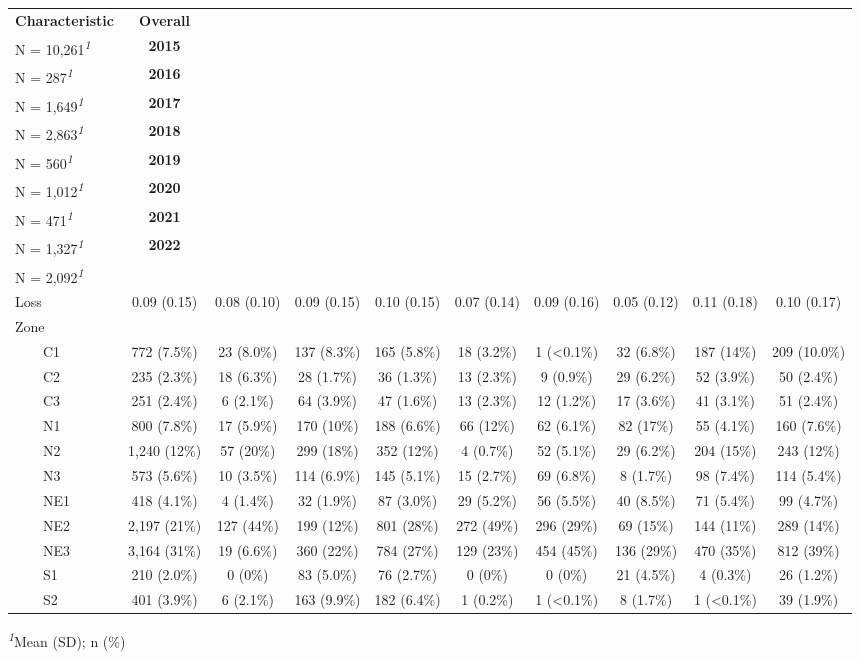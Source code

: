 \begingroup
\fontsize{12.0pt}{14.4pt}\selectfont
\setlength{\LTpost}{0mm}
\begin{longtable}{lccccccccc}
\toprule
\textbf{Characteristic} & \textbf{Overall}\\
N = 10,261\textsuperscript{\textit{1}} & \textbf{2015}\\
N = 287\textsuperscript{\textit{1}} & \textbf{2016}\\
N = 1,649\textsuperscript{\textit{1}} & \textbf{2017}\\
N = 2,863\textsuperscript{\textit{1}} & \textbf{2018}\\
N = 560\textsuperscript{\textit{1}} & \textbf{2019}\\
N = 1,012\textsuperscript{\textit{1}} & \textbf{2020}\\
N = 471\textsuperscript{\textit{1}} & \textbf{2021}\\
N = 1,327\textsuperscript{\textit{1}} & \textbf{2022}\\
N = 2,092\textsuperscript{\textit{1}} \\ 
\midrule\addlinespace[2.5pt]
Loss & 0.09 (0.15) & 0.08 (0.10) & 0.09 (0.15) & 0.10 (0.15) & 0.07 (0.14) & 0.09 (0.16) & 0.05 (0.12) & 0.11 (0.18) & 0.10 (0.17) \\ 
Zone &  &  &  &  &  &  &  &  &  \\ 
    C1 & 772 (7.5\%) & 23 (8.0\%) & 137 (8.3\%) & 165 (5.8\%) & 18 (3.2\%) & 1 (<0.1\%) & 32 (6.8\%) & 187 (14\%) & 209 (10.0\%) \\ 
    C2 & 235 (2.3\%) & 18 (6.3\%) & 28 (1.7\%) & 36 (1.3\%) & 13 (2.3\%) & 9 (0.9\%) & 29 (6.2\%) & 52 (3.9\%) & 50 (2.4\%) \\ 
    C3 & 251 (2.4\%) & 6 (2.1\%) & 64 (3.9\%) & 47 (1.6\%) & 13 (2.3\%) & 12 (1.2\%) & 17 (3.6\%) & 41 (3.1\%) & 51 (2.4\%) \\ 
    N1 & 800 (7.8\%) & 17 (5.9\%) & 170 (10\%) & 188 (6.6\%) & 66 (12\%) & 62 (6.1\%) & 82 (17\%) & 55 (4.1\%) & 160 (7.6\%) \\ 
    N2 & 1,240 (12\%) & 57 (20\%) & 299 (18\%) & 352 (12\%) & 4 (0.7\%) & 52 (5.1\%) & 29 (6.2\%) & 204 (15\%) & 243 (12\%) \\ 
    N3 & 573 (5.6\%) & 10 (3.5\%) & 114 (6.9\%) & 145 (5.1\%) & 15 (2.7\%) & 69 (6.8\%) & 8 (1.7\%) & 98 (7.4\%) & 114 (5.4\%) \\ 
    NE1 & 418 (4.1\%) & 4 (1.4\%) & 32 (1.9\%) & 87 (3.0\%) & 29 (5.2\%) & 56 (5.5\%) & 40 (8.5\%) & 71 (5.4\%) & 99 (4.7\%) \\ 
    NE2 & 2,197 (21\%) & 127 (44\%) & 199 (12\%) & 801 (28\%) & 272 (49\%) & 296 (29\%) & 69 (15\%) & 144 (11\%) & 289 (14\%) \\ 
    NE3 & 3,164 (31\%) & 19 (6.6\%) & 360 (22\%) & 784 (27\%) & 129 (23\%) & 454 (45\%) & 136 (29\%) & 470 (35\%) & 812 (39\%) \\ 
    S1 & 210 (2.0\%) & 0 (0\%) & 83 (5.0\%) & 76 (2.7\%) & 0 (0\%) & 0 (0\%) & 21 (4.5\%) & 4 (0.3\%) & 26 (1.2\%) \\ 
    S2 & 401 (3.9\%) & 6 (2.1\%) & 163 (9.9\%) & 182 (6.4\%) & 1 (0.2\%) & 1 (<0.1\%) & 8 (1.7\%) & 1 (<0.1\%) & 39 (1.9\%) \\ 
\bottomrule
\end{longtable}
\begin{minipage}{\linewidth}
\textsuperscript{\textit{1}}Mean (SD); n (\%)\\
\end{minipage}
\endgroup

